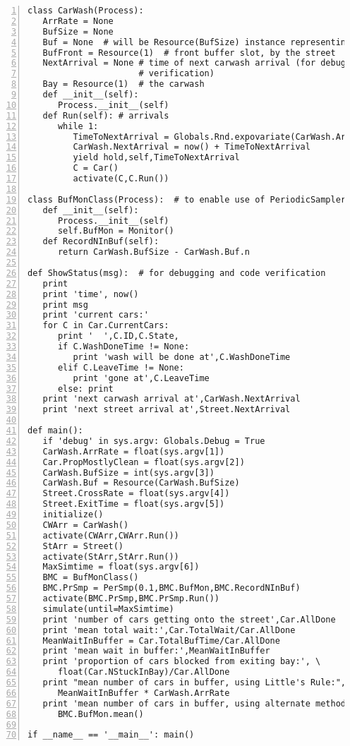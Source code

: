 \documentclass[11pt]{article}
\begin{document}
\begin{Verbatim}[fontsize=\relsize{-2},numbers=left]
class CarWash(Process):
   ArrRate = None
   BufSize = None
   Buf = None  # will be Resource(BufSize) instance representing buffer
   BufFront = Resource(1)  # front buffer slot, by the street
   NextArrival = None # time of next carwash arrival (for debugging/code
                      # verification)
   Bay = Resource(1)  # the carwash
   def __init__(self):
      Process.__init__(self)
   def Run(self): # arrivals
      while 1:
         TimeToNextArrival = Globals.Rnd.expovariate(CarWash.ArrRate)
         CarWash.NextArrival = now() + TimeToNextArrival
         yield hold,self,TimeToNextArrival
         C = Car()
         activate(C,C.Run())

class BufMonClass(Process):  # to enable use of PeriodicSampler
   def __init__(self):
      Process.__init__(self)
      self.BufMon = Monitor()
   def RecordNInBuf(self):
      return CarWash.BufSize - CarWash.Buf.n

def ShowStatus(msg):  # for debugging and code verification
   print
   print 'time', now()
   print msg
   print 'current cars:'
   for C in Car.CurrentCars:
      print '  ',C.ID,C.State,
      if C.WashDoneTime != None: 
         print 'wash will be done at',C.WashDoneTime
      elif C.LeaveTime != None:
         print 'gone at',C.LeaveTime
      else: print
   print 'next carwash arrival at',CarWash.NextArrival
   print 'next street arrival at',Street.NextArrival

def main():
   if 'debug' in sys.argv: Globals.Debug = True
   CarWash.ArrRate = float(sys.argv[1])
   Car.PropMostlyClean = float(sys.argv[2])
   CarWash.BufSize = int(sys.argv[3])
   CarWash.Buf = Resource(CarWash.BufSize)
   Street.CrossRate = float(sys.argv[4])
   Street.ExitTime = float(sys.argv[5])
   initialize()  
   CWArr = CarWash()
   activate(CWArr,CWArr.Run())
   StArr = Street()
   activate(StArr,StArr.Run())
   MaxSimtime = float(sys.argv[6])
   BMC = BufMonClass()
   BMC.PrSmp = PerSmp(0.1,BMC.BufMon,BMC.RecordNInBuf)
   activate(BMC.PrSmp,BMC.PrSmp.Run())
   simulate(until=MaxSimtime)
   print 'number of cars getting onto the street',Car.AllDone
   print 'mean total wait:',Car.TotalWait/Car.AllDone
   MeanWaitInBuffer = Car.TotalBufTime/Car.AllDone
   print 'mean wait in buffer:',MeanWaitInBuffer
   print 'proportion of cars blocked from exiting bay:', \
      float(Car.NStuckInBay)/Car.AllDone
   print "mean number of cars in buffer, using Little's Rule:", \
      MeanWaitInBuffer * CarWash.ArrRate  
   print 'mean number of cars in buffer, using alternate method:', \
      BMC.BufMon.mean()

if __name__ == '__main__': main()
\end{Verbatim}
\end{document}

